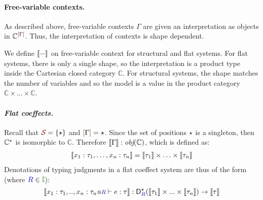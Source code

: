 %
%

\paragraph{Free-variable contexts.} 
As described above, free-variable contexts $\Gamma$ are given an
interpretation as objects in $\mathbb{C}^{\mksh{\Gamma}}$. Thus,
the interpretation of contexts is shape dependent. 

We define $\llbracket - \rrbracket$ on free-variable context for structural and flat
systems. For flat systems, there is only a single shape, so the interpretation
is a product type inside the Cartesian closed category $\mathbb{C}$. For 
structural systems, the shape matches the number of variables and so the model 
is a value in the product category $\mathbb{C} \times \ldots \times \mathbb{C}$.

\paragraph{\textnormal{\emph{Flat coeffects.}}} 
Recall that $\SH = \{\sflat\}$ and $\mksh{\Gamma} = \sflat$.
Since the set of positions $\star$ is a singleton, then $\mathbb{C}^{\star}$
is isomorphic to $\mathbb{C}$.
%
%
%
Therefore $\llbracket \Gamma \rrbracket : \emph{obj}(\mathbb{C})$, which is defined as:
%
%
\begin{align*}
\llbracket x_1 : \tau_1, \ldots, x_n : \tau_n \rrbracket = \llbracket \tau_1 \rrbracket \times \ldots \times \llbracket \tau_n \rrbracket
\end{align*}
%
Denotations of typing judgments in a flat coeffect system are thus of the form 
(where $\aclrd{R} \in \Icat$): 
$$\interp{\coctx{x_1 : \tau_1, .., 
x_n : \tau_n}{\aclrd{R}} \vdash e : \tau} : \D^{\sflat}_{\aclrd{R}}(\interp{\tau_1} \times ... \times \interp{\tau_n})
\rightarrow \interp{\tau}
$$

